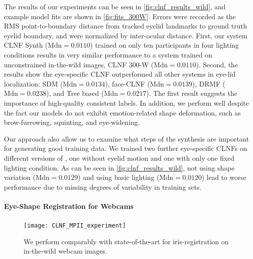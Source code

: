 The results of our experiments can be seen in \autoref{fig:clnf_results_wild}, and example model fits are shown in \autoref{fig:fits_300W}.
Errors were recorded as the RMS point-to-boundary distance from tracked eyelid landmarks to ground truth eyelid boundary, and were normalized by inter-ocular distance. 
%
First, our system CLNF Synth ($\mathrm{Mdn}=0.0110$) trained on only ten participants in four lighting conditions results in very similar performance to a system trained on unconstrained in-the-wild images, CLNF 300-W ($\mathrm{Mdn}=0.0110$).
%
Second, the results show the eye-specific CLNF outperformed all other systems in eye-lid localization: SDM ($\mathrm{Mdn}=0.0134$), face-CLNF ($\mathrm{Mdn}=0.0139$), DRMF ($\mathrm{Mdn}=0.0238$), and Tree based ($\mathrm{Mdn}=0.0217$). 
The first result suggests the importance of high-quality consistent labels. In addition, we perform well despite the fact our models do not exhibit emotion-related shape deformation, such as brow-furrowing, squinting, and eye-widening.

Our approach also allow us to examine what steps of the synthesis are important for generating good training data. We trained two further eye-specific CLNFs on different versions of \dataset, one without eyelid motion and one with only one fixed lighting condition. As can be seen in \autoref{fig:clnf_results_wild}, not using shape variation ($\mathrm{Mdn}=0.0129$) and using basic lighting ($\mathrm{Mdn}=0.0120$) lead to worse performance due to missing degrees of variability in training sets.

\paragraph{Eye-Shape Registration for Webcams}




\begin{figure}
    \centering
    \texttt{[image: CLNF\_MPII\_experiment]}
    \caption{We perform comparably with state-of-the-art for iris-registration on in-the-wild webcam images.}
    \label{fig:clnf_results_MPII}
\end{figure}

